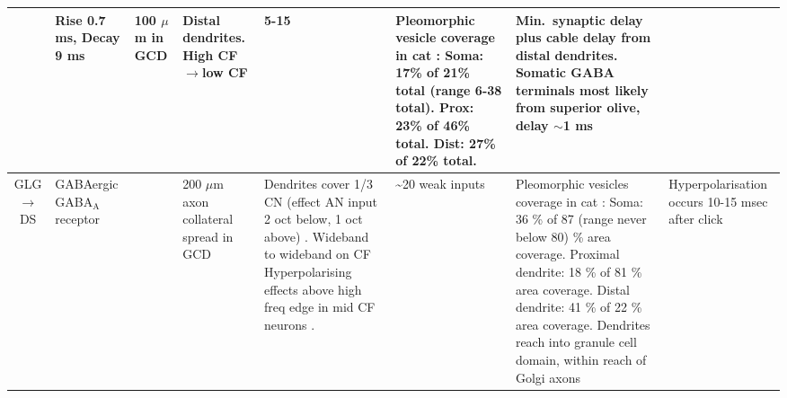\begin{longtable}{cYYYYYYY}
                                & %
Rise 0.7 ms, Decay 9 ms  \citep[probably a combination of two decay time constants, fast 5-10 slow 20-60][]{AwatramaniTurecekEtAl:2005}                     
                                & %
100 $\mu$m in GCD \citep{FerragamoGoldingEtAl:1998}
                                & %
Distal dendrites.
High CF\ensuremath{\rightarrow}low CF \citep[chinchilla][]{JosephsonMorest:1998}                        
                                & %
5-15 \citep[Estimate, cat][]{SmithRhode:1989}     
                                & %
Pleomorphic vesicle coverage in cat \citep{SmithRhode:1989}:
Soma: 17\% of 21\% total (range 6-38 total). 
Prox: 23\% of 46\% total. 
Dist: 27\% of 22\% total. 
                                & %
Min.\ synaptic delay plus cable delay from distal dendrites.
Somatic GABA terminals most likely from superior olive, delay $\sim$1 ms
\\ \midrule
GLG\ensuremath{\rightarrow}DS                         
                                & %
{GABAergic} {GABA$_{\textrm{A}}$} receptor \citep{EvansZhao:1998,FerragamoGoldingEtAl:1998a,Mugnaini:1985,MugnainiOsenEtAl:1980,SaintMorestEtAl:1989}                           
                                & %
                                & %
200 $\mu$m axon collateral spread in GCD \citep{FerragamoGoldingEtAl:1998}
                                & %
Dendrites cover 1/3 CN (effect AN input 2 oct below, 1 oct above) \citep[guinea pig][]{PalmerJiangEtAl:1996}.
Wideband to wideband on CF \citep{EvansZhao:1998} 
Hyperpolarising effects above high freq edge in mid CF neurons \citep[rat][]{PaoliniClark:1999}.                    
                                & %
\~{}20 weak inputs\citep{SaintMorestEtAl:1989}                     
                                & %
Pleomorphic vesicles coverage in cat \citep{SmithRhode:1989}:
Soma: 36 \%  of 87 (range never below 80) \% area coverage. 
Proximal dendrite: 18 \%  of 81 \% area coverage.  
Distal dendrite: 41 \%  of 22 \% area coverage.   
Dendrites reach into granule cell domain, within reach of Golgi axons \citep{OertelWuEtAl:1990,ArnottWallaceEtAl:2004}     
                                & %
Hyperpolarisation occurs 10-15 msec after click \citep{PaoliniClark:1999}
\\ \midrule
\end{longtable}





